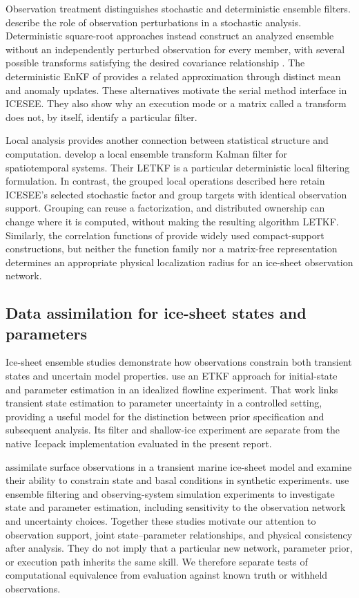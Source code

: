 \documentclass[11pt,a4paper]{article}
\begin{document}
Observation treatment distinguishes stochastic and deterministic ensemble filters. \citet{burgers1998} describe the role of observation perturbations in a stochastic analysis. Deterministic square-root approaches instead construct an analyzed ensemble without an independently perturbed observation for every member, with several possible transforms satisfying the desired covariance relationship \citep{tippett2003}. The deterministic EnKF of \citet{sakov2008} provides a related approximation through distinct mean and anomaly updates. These alternatives motivate the serial method interface in ICESEE. They also show why an execution mode or a matrix called a transform does not, by itself, identify a particular filter.

Local analysis provides another connection between statistical structure and computation. \citet{hunt2007} develop a local ensemble transform Kalman filter for spatiotemporal systems. Their LETKF is a particular deterministic local filtering formulation. In contrast, the grouped local operations described here retain ICESEE's selected stochastic factor and group targets with identical observation support. Grouping can reuse a factorization, and distributed ownership can change where it is computed, without making the resulting algorithm LETKF. Similarly, the correlation functions of \citet{gaspari1999} provide widely used compact-support constructions, but neither the function family nor a matrix-free representation determines an appropriate physical localization radius for an ice-sheet observation network.

\subsection{Data assimilation for ice-sheet states and parameters}
Ice-sheet ensemble studies demonstrate how observations constrain both transient states and uncertain model properties. \citet{bonan2014} use an ETKF approach for initial-state and parameter estimation in an idealized flowline experiment. That work links transient state estimation to parameter uncertainty in a controlled setting, providing a useful model for the distinction between prior specification and subsequent analysis. Its filter and shallow-ice experiment are separate from the native Icepack implementation evaluated in the present report.

\citet{gilletchaulet2020} assimilate surface observations in a transient marine ice-sheet model and examine their ability to constrain state and basal conditions in synthetic experiments. \citet{choi2025} use ensemble filtering and observing-system simulation experiments to investigate state and parameter estimation, including sensitivity to the observation network and uncertainty choices. Together these studies motivate our attention to observation support, joint state--parameter relationships, and physical consistency after analysis. They do not imply that a particular new network, parameter prior, or execution path inherits the same skill. We therefore separate tests of computational equivalence from evaluation against known truth or withheld observations.
\end{document}
